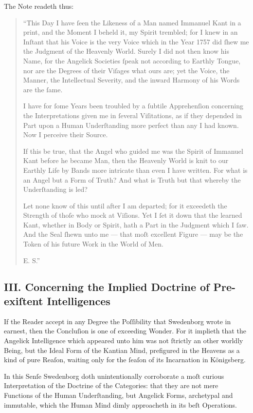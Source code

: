 \documentclass[12pt]{article}
\begin{document}
The Note readeth thus:

\begin{quotation}
\noindent
``This Day I have ſeen the Likeness of a Man named Immanuel Kant in a print, 
and the Moment I beheld it, my Spirit trembled; for I knew in an Inſtant that 
his Voice is the very Voice which in the Year 1757 did ſhew me the Judgment of 
the Heavenly World. Surely I did not then know his Name, for the Angelick 
Societies ſpeak not according to Earthly Tongue, nor are the Degrees of their 
Viſages what ours are; yet the Voice, the Manner, the Intellectual Severity, 
and the inward Harmony of his Words are the ſame.

I have for ſome Years been troubled by a ſubtile Apprehenſion concerning the 
Interpretations given me in ſeveral Viſitations, as if they depended in Part 
upon a Human Underſtanding more perfect than any I had known. Now I perceive 
their Source.

If this be true, that the Angel who guided me was the Spirit of Immanuel Kant 
before he became Man, then the Heavenly World is knit to our Earthly Life by 
Bands more intricate than even I have written. For what is an Angel but a 
Form of Truth? And what is Truth but that whereby the Underſtanding is led?

Let none know of this until after I am departed; for it exceedeth the Strength 
of thoſe who mock at Viſions. Yet I ſet it down that the learned Kant, whether 
in Body or Spirit, hath a Part in the Judgment which I ſaw. And the Seal 
ſhewn unto me — that moſt excellent Figure — may be the Token of his future 
Work in the World of Men.

E. S.''
\end{quotation}

\subsection*{III. Concerning the Implied Doctrine of Pre-exiſtent Intelligences}
If the Reader accept in any Degree the Poſſibility that Swedenborg wrote in 
earnest, then the Concluſion is one of exceeding Wonder. For it implieth that 
the Angelick Intelligence which appeared unto him was not ſtrictly an other­
worldly Being, but the Ideal Form of the Kantian Mind, prefigured in the 
Heavens as a kind of pure Reaſon, waiting only for the ſeaſon of its 
Incarna­tion in Königsberg.

In this Senſe Swedenborg doth unintentionally corroborate a moſt curious 
Interpretation of the Doctrine of the Categories: that they are not mere 
Functions of the Human Underſtanding, but Angelick Forms, archetypal and 
immutable, which the Human Mind dimly approacheth in its beſt Operations.
\end{document}
